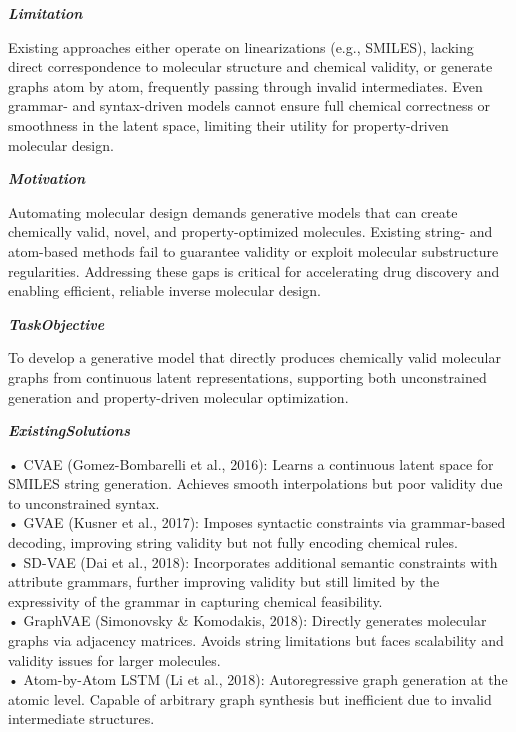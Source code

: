 \begin{tcolorbox}[
    breakable,
    title={Example of Idea Generation in Chemistry},
    colback=LighterGray,
    colframe=DeepPurple,
    colbacktitle=DeepPurple,
    coltitle=White,
]
\textbf{\emph{\textcolor{CaseOrange}{Limitation}}}

Existing approaches either operate on linearizations (e.g., SMILES), lacking direct correspondence
to molecular structure and chemical validity, or generate graphs atom by atom, frequently passing
through invalid intermediates. Even grammar- and syntax-driven models cannot ensure full chemical
correctness or smoothness in the latent space, limiting their utility for property-driven molecular
design.

\textbf{\emph{\textcolor{CaseOrange}{Motivation}}}

Automating molecular design demands generative models that can create chemically valid, novel, and
property-optimized molecules. Existing string- and atom-based methods fail to guarantee validity or
exploit molecular substructure regularities. Addressing these gaps is critical for accelerating drug
discovery and enabling efficient, reliable inverse molecular design.

\textbf{\emph{\textcolor{CaseOrange}{TaskObjective}}}

To develop a generative model that directly produces chemically valid molecular graphs from
continuous latent representations, supporting both unconstrained generation and property-driven
molecular optimization.

\textbf{\emph{\textcolor{CaseOrange}{ExistingSolutions}}}

• CVAE (Gomez-Bombarelli et al., 2016): Learns a continuous latent space for SMILES string generation. Achieves smooth interpolations but poor validity due to unconstrained syntax. \\
• GVAE (Kusner et al., 2017): Imposes syntactic constraints via grammar-based decoding, improving string validity but not fully encoding chemical rules. \\
• SD-VAE (Dai et al., 2018): Incorporates additional semantic constraints with attribute grammars, further improving validity but still limited by the expressivity of the grammar in capturing chemical feasibility. \\
• GraphVAE (Simonovsky \& Komodakis, 2018): Directly generates molecular graphs via adjacency matrices. Avoids string limitations but faces scalability and validity issues for larger molecules. \\
• Atom-by-Atom LSTM (Li et al., 2018): Autoregressive graph generation at the atomic level. Capable of arbitrary graph synthesis but inefficient due to invalid intermediate structures. 


\end{tcolorbox}

